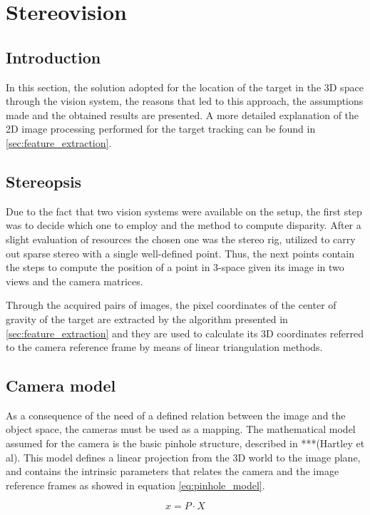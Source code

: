 
\section{Stereovision} %
\label{sec:stereopsis}

\subsection{Introduction}
In this section, the solution adopted for the location of the target in the 3D space through the vision system, the reasons that led to this approach, the assumptions made and the obtained results are presented. 
A more detailed explanation of the 2D image processing performed for the target tracking can be found in \ref{sec:feature_extraction}.

\subsection{Stereopsis}
Due to the fact that two vision systems were available on the setup, the first step was to decide which one to employ and the method to compute disparity. 
After a slight evaluation of resources the chosen one was the stereo rig, utilized to carry out sparse stereo with a single well-defined point. 
Thus, the next points contain the steps to compute the position of a point in 3-space given its image in two views and the camera matrices. 

Through the acquired pairs of images, the pixel coordinates of the center of gravity of the target are extracted by the algorithm presented in \ref{sec:feature_extraction} and they are used to calculate its 3D coordinates referred to the camera reference frame by means of linear triangulation methods.

\subsection{Camera model}
As a consequence of the need of a defined relation between the image and the object space, the cameras must be used as a mapping. 
The mathematical model assumed for the camera is the basic pinhole structure, described in ***(Hartley et al). 
This model defines a linear projection from the 3D world to the image plane, and contains the intrinsic parameters that relates the camera and the image reference frames as showed in equation \ref{eq:pinhole_model}. 

\begin{equation}
x = P·X
\label{eq:pinhole_model}
\end{equation}  

